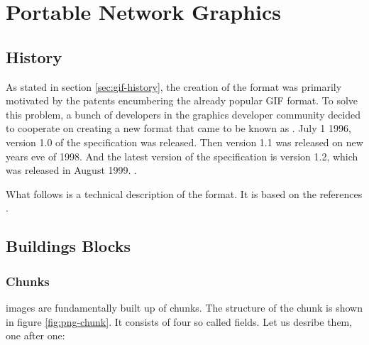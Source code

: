 \begin{comment}
  
\end{comment}


\chapter{Portable Network Graphics}
\label{cha:png}

\newcommand{\chnk}[1]{``#1''}

\newcommand{\IDAT}{\chnk{IDAT}\xspace}

\section{History}

As stated in section \ref{sec:gif-history}, the creation of the \png
format was primarily motivated by the patents encumbering the already
popular GIF format. To solve this problem, a bunch of developers in
the graphics developer community decided to cooperate on creating a
new format that came to be known as \png. July 1 1996, version 1.0 of
the \png specification was released. Then version 1.1 was released on
new years eve of 1998. And the latest version of the \png specification
is version 1.2, which was released in August 1999.
\cite{roelofs09:_histor_portab_networ_graph_png_format,roelofs99:_png,roelofs:_portab_networ_graph_main}.

What follows is a technical description of the \png format. It is based
on the references
\cite{boutel:_png_portab_networ_graph_specif_version12,roelofs99:_png,boutel:_png_portab_networ_graph_specif_version11}.

\section{Buildings Blocks}

\subsection{Chunks}

\png images are fundamentally built up of chunks. The structure of the
chunk is shown in figure \ref{fig:png-chunk}. It consists of four so
called fields. Let us desribe them, one after one:

